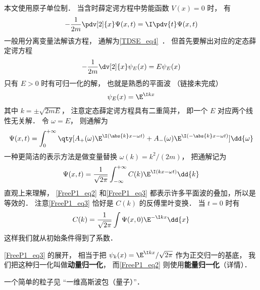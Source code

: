 
\begin{issues}
\issueDraft
\end{issues}


本文使用原子单位制． 当含时薛定谔方程中势能函数 $V(x) = 0$ 时， 有
\begin{equation}\label{FreeP1_eq1}
-\frac{1}{2m}\pdv[2]{x}\Psi(x,t) = \I \pdv{t} \Psi(x,t)
\end{equation}
一般用分离变量法解该方程， 通解为\autoref{TDSE_eq4}~． 但首先要解出对应的定态薛定谔方程
\begin{equation}
-\frac{1}{2m}\dv[2]{x}\psi_E(x) = E \psi_E(x)
\end{equation}
只有 $E > 0$ 时有可归一化的解， 也就是熟悉的平面波 （链接未完成）
\begin{equation}
\psi_E(x) = \E^{\I k x}
\end{equation}
其中 $k = \pm\sqrt{2mE}$， 注意定态薛定谔方程具有二重简并， 即一个 $E$ 对应两个线性无关解． 令 $\omega = E$， 则通解为
\begin{equation}\label{FreeP1_eq2}
\Psi(x,t) = \int_{0}^{+\infty} \qty[A_+(\omega) \E^{\I (\abs{k}x - \omega t)} + A_-(\omega) \E^{\I (-\abs{k}x - \omega t)}] \dd{\omega}
\end{equation}
一种更简洁的表示方法是做变量替换 $\omega(k) = k^2/(2m)$， 把通解记为
\begin{equation}\label{FreeP1_eq3}
\Psi(x,t) = \frac{1}{\sqrt{2\pi}} \int_{-\infty}^{+\infty} C(k) \E^{\I (k x - \omega t)} \dd{k}
\end{equation}
直观上来理解， \autoref{FreeP1_eq2} 和\autoref{FreeP1_eq3} 都表示许多平面波的叠加，所以是等效的． 注意\autoref{FreeP1_eq3} 恰好是 $C(k)$ 的反傅里叶变换． 当 $t = 0$ 时有
\begin{equation}
C(k) = \frac{1}{\sqrt{2\pi}} \int \Psi(x,0) \E^{-\I k x} \dd{x}
\end{equation}
这样我们就从初始条件得到了系数．

\autoref{FreeP1_eq3} 的展开， 相当于把 $\psi_k(x) = \E^{\I kx}/\sqrt{2\pi}$ 作为正交归一的基底， 我们把这种归一化叫做\textbf{动量归一化}， 而\autoref{FreeP1_eq2} 则使用\textbf{能量归一化}（详情）．

一个简单的粒子见 “一维高斯波包（量子）”．
